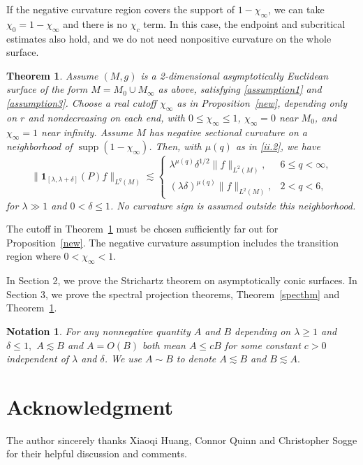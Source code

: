 \documentclass[11pt]{amsart}
\newcommand{\la}{\lambda}
\newtheorem*{notation}{Notation}
\newtheorem{theorem}{Theorem}
\begin{document}
If the negative curvature region covers the support of $1-\chi_\infty$, we can take $\chi_0=1-\chi_\infty$ and there is no $\chi_c$ term. In this case, the endpoint and subcritical estimates also hold, and we do not need nonpositive curvature on the whole surface.
\begin{theorem}\label{specthm-full}
Assume $(M,g)$ is a 2-dimensional asymptotically Euclidean surface of the form $M=M_0\cup M_\infty$ as above, satisfying \eqref{assumption1} and \eqref{assumption3}. Choose a real cutoff $\chi_\infty$ as in Proposition~\ref{new}, depending only on $r$ and nondecreasing on each end, with $0\leq\chi_\infty\leq1$, $\chi_\infty=0$ near $M_0$, and $\chi_\infty=1$ near infinity. Assume $M$ has negative sectional curvature on a neighborhood of $\operatorname{supp}(1-\chi_\infty)$. Then, with $\mu(q)$ as in \eqref{ii.2}, we have
\begin{equation}\label{eq:spec-full-range}
\|\mathbf{1}_{[\la,\la+\delta]}(P)f\|_{L^q(M)}
\lesssim
\begin{cases}
\la^{\mu(q)}\delta^{1/2}\|f\|_{L^2(M)}, & 6\leq q<\infty,\\
(\la\delta)^{\mu(q)}\|f\|_{L^2(M)}, & 2<q<6,
\end{cases}
\end{equation}
for $\la\gg1$ and $0<\delta\leq1$. No curvature sign is assumed outside this neighborhood.
\end{theorem}
The cutoff in Theorem~\ref{specthm-full} must be chosen sufficiently far out for Proposition~\ref{new}. The negative curvature assumption includes the transition region where $0<\chi_\infty<1$.

In Section 2, we prove the Strichartz theorem on asymptotically conic surfaces. In Section 3, we prove the spectral projection theorems, Theorem~\ref{specthm} and Theorem~\ref{specthm-full}.

\begin{notation}
    For any nonnegative quantity $A$ and $B$ depending on $\lambda\geq 1$ and $\delta\leq 1,$ $A\lesssim B$ and $A=O(B)$ both mean $A\leq cB$ for some constant $c>0$ independent of $\lambda$ and $\delta$. We use $A \sim B$ to denote $A\lesssim B$ and $B\lesssim A.$
\end{notation}

\section*{Acknowledgment} 
The author sincerely thanks Xiaoqi Huang, Connor Quinn and Christopher Sogge for their helpful discussion and comments.
\end{document}
